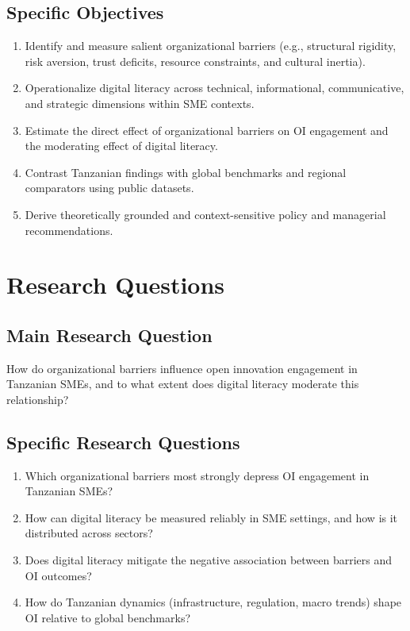 \subsection{Specific Objectives}
\begin{enumerate}[label=O\arabic*., leftmargin=*]
  \item Identify and measure salient organizational barriers (e.g., structural rigidity, risk aversion, trust deficits, resource constraints, and cultural inertia).
  \item Operationalize digital literacy across technical, informational, communicative, and strategic dimensions within SME contexts.
  \item Estimate the direct effect of organizational barriers on OI engagement and the moderating effect of digital literacy.
  \item Contrast Tanzanian findings with global benchmarks and regional comparators using public datasets.
  \item Derive theoretically grounded and context-sensitive policy and managerial recommendations.
\end{enumerate}

\section{Research Questions}\label{sec:questions}
\subsection{Main Research Question}
How do organizational barriers influence open innovation engagement in Tanzanian SMEs, and to what extent does digital literacy moderate this relationship?

\subsection{Specific Research Questions}
\begin{enumerate}[label=RQ\arabic*., leftmargin=*]
  \item Which organizational barriers most strongly depress OI engagement in Tanzanian SMEs?
  \item How can digital literacy be measured reliably in SME settings, and how is it distributed across sectors?
  \item Does digital literacy mitigate the negative association between barriers and OI outcomes?
  \item How do Tanzanian dynamics (infrastructure, regulation, macro trends) shape OI relative to global benchmarks?
\end{enumerate}

